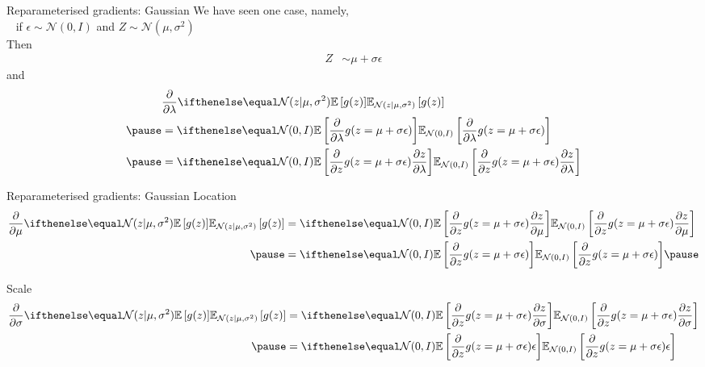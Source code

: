 \documentclass[14pt,dvipsnames]{beamer}
\begin{document}
\begin{frame}{Reparameterised gradients: Gaussian}
	We have  seen one case, namely,\\
	~ if $\epsilon \sim \mathcal N(0, I)$ and $Z \sim \mathcal N(\mu,\sigma^2)$\pause\\
	Then
	\begin{equation*}
	\begin{aligned}
		Z &\sim \mu +  \sigma  \epsilon
	\end{aligned}
	\end{equation*}
	and
	\begin{equation*}
	\begin{aligned}
		&\pdv{\lambda} \E[\mathcal N(z|\mu, \sigma^2)]{ g(z) }\\ \pause
		&= \E[\mathcal N(0, I)]{\pdv{\lambda} g(z = \mu + \sigma  \epsilon)} \\ \pause
		&= \E[\mathcal N(0, I)]{\pdv{z} g(z = \mu + \sigma  \epsilon) \pdv{z}{\lambda}}
	\end{aligned}
	\end{equation*}
\end{frame}

\begin{frame}{Reparameterised gradients: Gaussian}
	Location
	\begin{equation*}
	\begin{aligned}
		\pdv{\mu} \E[\mathcal N(z|\mu, \sigma^2)]{ g(z) }
			&= \E[\mathcal N(0, I)]{\pdv{z} g(z = \mu + \sigma  \epsilon) \pdv{z}{\mu}} \\ \pause
		&= \E[\mathcal N(0, I)]{\pdv{z} g(z = \mu + \sigma  \epsilon)} \pause
	\end{aligned}
	\end{equation*}
	
	Scale
	\begin{equation*}
	\begin{aligned}
		\pdv{\sigma} \E[\mathcal N(z|\mu, \sigma^2)]{ g(z) } &= \E[\mathcal N(0, I)]{\pdv{z} g(z = \mu + \sigma  \epsilon) \pdv{z}{\sigma}} \\ \pause
		&= \E[\mathcal N(0, I)]{\pdv{z} g(z = \mu + \sigma  \epsilon)  \epsilon} 
	\end{aligned}
	\end{equation*}
	
\end{frame}
\end{document}
